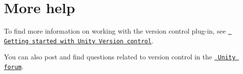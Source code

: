 \chapter{More help}
\hypertarget{md__library_2_package_cache_2com_8unity_8collab-proxy_0d2_83_81_2_documentation_0i_2_more_help}{}\label{md__library_2_package_cache_2com_8unity_8collab-proxy_0d2_83_81_2_documentation_0i_2_more_help}
\label{md__library_2_package_cache_2com_8unity_8collab-proxy_0d2_83_81_2_documentation_0i_2_more_help_autotoc_md154}%
%
 To find more information on working with the  version control plug-\/in, see \href{https://docs.unity3d.com/2022.1/Documentation/Manual/PlasticSCMPluginGettingStarted.html}{\texttt{ Getting started with Unity Version control}}.

You can also post and find questions related to  version control in the \href{https://forum.unity.com/forums/plastic-scm.605/}{\texttt{ Unity forum}}. 